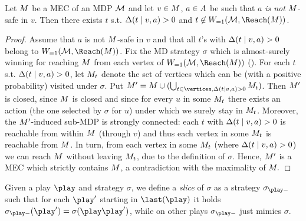 \begin{lemma}
\label{5-lem:MEC-noreturn}
Let $ M $ be a MEC of an MDP $ \mathcal{M} $ and let $ v\in M $, $ a\in A $ be such that $ a $ \emph{is not} $ M $-safe in $ v $. Then there exists $ t $ s.t. $ \Delta(t\mid v,a)>0 $ and  $ t \not \in \winAS(\mdp,\Reach(\mec)) $.
\end{lemma}
\begin{proof}
Assume that $ a $ is not $ M $-safe in $ v $ and that all $ t $'s with $ \Delta(t\mid v,a)>0 $ belong to $ \winAS(\mdp,\Reach(\mec)) $. Fix the MD strategy $  \sigma $ which is almost-surely winning for reaching $ M $ from each vertex of $ \winAS(\mdp,\Reach(\mec)) $ (). For each $ t $ s.t.  $ \Delta(t\mid v,a)>0 $, let $ M_t $ denote the set of vertices which can be (with a positive probability) visited under $ \sigma $. Put $ \mec' = \mec \cup (\bigcup_{t\in \vertices,\probTranFunc(t\mid v,a)>0}\mec_t )$. Then $ M' $ is closed, since $ M $ is closed and since for every $ u $ in some $ M_t $ there exists an action (the one selected by $ \sigma $ for $ u $) under which we surely stay in $ M_t $. Moreover, the $ M'$-induced sub-MDP is strongly connected: each $ t $ with $ \Delta(t\mid v,a)>0 $ is reachable from within $ M $ (through $ v $) and thus each vertex in some $M_t $ is reachable from $ M $. In turn, from each vertex in some $ M_t $ (where $ \Delta(t\mid v,a)>0 $) we can reach $ M $ without leaving $ M_t $, due to the definition of $ \sigma $. Hence, $ M' $ is a MEC which strictly contains $ M $, a contradiction with the maximality of $ M. $
\end{proof} 

Given a play $\play$ and strategy $\sigma$, we define a \emph{slice} of $\sigma$ as a strategy $\slice{\sigma}{\play}$ such that for each $\play'$ starting in $\last(\play)$ it holds $\slice{\sigma}{\play}(\play') = \sigma(\play\play')$, while on other plays $\slice{\sigma}{\play}$ just mimics $\sigma$.



